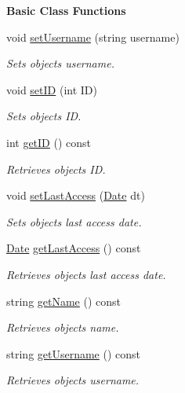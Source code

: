 \begin{Indent}\textbf{ Basic Class Functions}\par
\begin{DoxyCompactItemize}
\item 
void \hyperlink{group___user_ga0fed77d10cd142ee4112d650ec564e6b}{set\+Username} (string username)
\begin{DoxyCompactList}\small\item\em Sets object\textquotesingle{}s username. \end{DoxyCompactList}\item 
void \hyperlink{group___user_ga95feef2641a3141ef514a0bd52c3aaa2}{set\+ID} (int ID)
\begin{DoxyCompactList}\small\item\em Sets object\textquotesingle{}s ID. \end{DoxyCompactList}\item 
int \hyperlink{group___user_ga986c6f30aeac167bb5d311dd412cf604}{get\+ID} () const
\begin{DoxyCompactList}\small\item\em Retrieves object\textquotesingle{}s ID. \end{DoxyCompactList}\item 
void \hyperlink{group___user_ga5578e73f0915b2ebf38eff4434fc340d}{set\+Last\+Access} (\hyperlink{class_date}{Date} dt)
\begin{DoxyCompactList}\small\item\em Sets object\textquotesingle{}s last access date. \end{DoxyCompactList}\item 
\hyperlink{class_date}{Date} \hyperlink{group___user_ga9399e8ad03d939281357fe2e1d2a0f71}{get\+Last\+Access} () const
\begin{DoxyCompactList}\small\item\em Retrieves object\textquotesingle{}s last access date. \end{DoxyCompactList}\item 
string \hyperlink{group___user_gab9b2b5feb6bdd1582696eb6d44cee384}{get\+Name} () const
\begin{DoxyCompactList}\small\item\em Retrieves object\textquotesingle{}s name. \end{DoxyCompactList}\item 
string \hyperlink{group___user_ga82e034043e04b2d750c654c8b2f2ce78}{get\+Username} () const
\begin{DoxyCompactList}\small\item\em Retrieves object\textquotesingle{}s username. \end{DoxyCompactList}\item 

\end{DoxyCompactItemize}
\end{Indent}
